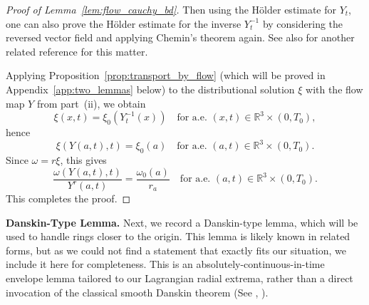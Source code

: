 \documentclass[reqno,11pt]{amsart}
\begin{document}
\begin{proof}[Proof of Lemma~\ref{lem:flow_cauchy_bd}]
Then using the H\"older estimate for $Y_t$, one can also prove the H\"older estimate for the inverse $Y_t^{-1}$ by considering the reversed vector field and applying Chemin's theorem again.
See also \cite[Lemma~8.2]{MajdaBertozzi01} for another related reference for this matter.

Applying Proposition~\ref{prop:transport_by_flow} (which will be proved in Appendix~\ref{app:two_lemmas} below) to the distributional solution
$\xi$ with the flow map $Y$ from part~(ii), we obtain
\[
\xi(x,t)=\xi_0(Y_t^{-1}(x))
\quad\text{for a.e. }(x,t)\in\mathbb R^3\times(0,T_0),
\]
hence
\[
\xi(Y(a,t),t)=\xi_0(a)
\quad\text{for a.e. }(a,t)\in\mathbb R^3\times(0,T_0).
\]
Since $\omega=r\xi$, this gives
\[
\frac{\omega(Y(a,t),t)}{Y^r(a,t)}=\frac{\omega_0(a)}{r_a}
\quad\text{for a.e. }(a,t)\in\mathbb R^3\times(0,T_0).
\]
This completes the proof.
\end{proof}








\medskip
\noindent\textbf{Danskin-Type Lemma.}
Next, we record a Danskin-type lemma, which will be used to handle rings closer to the origin. This lemma is  likely known in related forms, but as we could not find a statement that exactly fits our situation, we include it here for completeness.
This is an absolutely-continuous-in-time envelope lemma tailored to our Lagrangian radial extrema, rather than a direct invocation  of the classical smooth Danskin theorem (See \cite{Danskin67}, \cite{BernhardRapaport95}).
\end{document}
